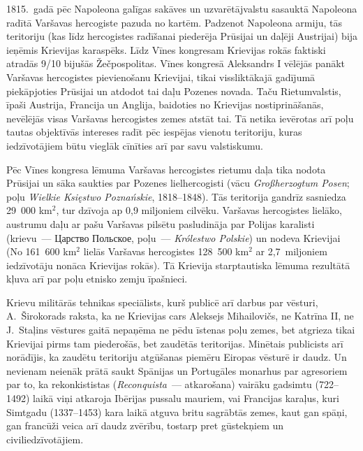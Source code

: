 \documentclass[twoside,a5paper,12pt,fleqn,openany]{extbook}
\newcommand{\asterism}{\vspace{1em}{\centering\Large\bfseries$\ast~\ast~\ast$\par}\vspace{1em}}
\newcommand{\pltxti}[1]{\textit{\textpolish{#1}}}
\newcommand{\rutxti}[1]{\textrussian{#1}}
\newcommand{\detxti}[1]{\textit{\textgerman{#1}}}
\newcommand{\estxti}[1]{\textit{\textspanish{#1}}}
\begin{document}
\asterism



1815.~gadā pēc Napoleona galīgas sakāves un uzvarētājvalstu sasauktā  Napoleona radītā Varšavas hercogiste pazuda no kartēm. Padzenot Napoleona armiju, tās teritoriju (kas līdz hercogistes radīšanai piederēja Prūsijai un daļēji Austrijai) bija ieņēmis Krievijas karaspēks. Līdz Vīnes kongresam Krievijas rokās faktiski atradās 9/10 bijušās Žečpospolitas. Vīnes kongresā Aleksandrs I vēlējās panākt Varšavas hercogistes pievienošanu Krievijai, tikai vissliktākajā gadījumā piekāpjoties Prūsijai un atdodot tai daļu Pozenes novada. Taču Rietumvalstis, īpaši Austrija, Francija un Anglija, baidoties no Krievijas nostiprināšanās, nevēlējās visas Varšavas hercogistes zemes atstāt tai. Tā netika ievērotas arī poļu tautas objektīvās intereses radīt pēc iespējas vienotu teritoriju, kuras iedzīvotājiem būtu vieglāk cīnīties arī par savu valstiskumu.

Pēc Vīnes kongresa lēmuma Varšavas hercogistes rietumu daļa tika nodota Prūsijai un sāka saukties par Pozenes lielhercogisti (vācu \detxti{Großherzogtum Posen}; poļu \pltxti{Wielkie Księstwo Poznańskie}, 1818--1848). Tās teritorija gandrīz sasniedza 29~000 km$^{2}$, tur dzīvoja ap 0,9 miljoniem cilvēku. Varšavas hercogistes lielāko, austrumu daļu ar pašu Varšavas pilsētu pasludināja par Polijas karalisti (krievu~--- \rutxti{Царство Польское}, poļu~--- \pltxti{Królestwo Polskie}) un nodeva Krievijai (No 161~600 km$^{2}$ lielās Varšavas hercogistes 128~500 km$^{2}$ ar 2,7~miljoniem iedzīvotāju nonāca Krievijas rokās). Tā Krievija starptautiska lēmuma rezultātā kļuva arī par poļu etnisko zemju īpašnieci.

Krievu militārās tehnikas speciālists, kurš publicē arī darbus par vēsturi, A.~Širokorads raksta, ka ne Krievijas cars Aleksejs Mihailovičs, ne Katrīna II, ne J.~Staļins vēstures gaitā nepaņēma ne pēdu īstenas poļu zemes, bet atgrieza tikai Krievijai pirms tam piederošās, bet zaudētās teritorijas. Minētais publicists arī norādījis, ka zaudētu teritoriju atgūšanas piemēru Eiropas vēsturē ir daudz. Un nevienam neienāk prātā saukt Spānijas un Portugāles monarhus par agresoriem par to, ka rekonkististas (\estxti{Reconquista}~--- atkarošana) vairāku gadsimtu (722--1492) laikā viņi atkaroja Ibērijas pussalu mauriem, vai Francijas karaļus, kuri Simtgadu (1337--1453) kara laikā atguva britu sagrābtās zemes, kaut gan spāņi, gan francūži veica arī daudz zvērību, tostarp pret gūstekņiem un civiliedzīvotājiem.
\end{document}
